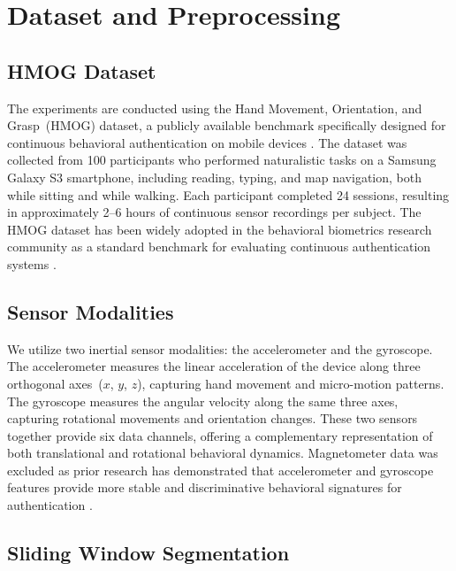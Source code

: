 \documentclass[3p,times,procedia]{elsarticle}
\begin{document}

\section{Dataset and Preprocessing}
\label{sec:dataset}

\subsection{HMOG Dataset}

The experiments are conducted using the Hand Movement,
Orientation, and Grasp~(HMOG) dataset, a publicly available
benchmark specifically designed for continuous behavioral
authentication on mobile devices \cite{sitova_hmog_2016}. The dataset
was collected from 100 participants who performed naturalistic
tasks on a Samsung Galaxy S3 smartphone, including reading,
typing, and map navigation, both while sitting and while
walking. Each participant completed 24 sessions, resulting in
approximately 2--6 hours of continuous sensor recordings per
subject. The HMOG dataset has been widely adopted in the
behavioral biometrics research community as a standard benchmark
for evaluating continuous authentication systems \cite{sitova_hmog_2016}.

\subsection{Sensor Modalities}

We utilize two inertial sensor modalities: the accelerometer
and the gyroscope. The accelerometer measures the linear
acceleration of the device along three orthogonal
axes~($x$, $y$, $z$), capturing hand movement and micro-motion
patterns. The gyroscope measures the angular velocity along the
same three axes, capturing rotational movements and orientation
changes. These two sensors together provide six data channels,
offering a complementary representation of both translational
and rotational behavioral dynamics. Magnetometer data was
excluded as prior research has demonstrated that accelerometer
and gyroscope features provide more stable and discriminative
behavioral signatures for authentication \cite{shen_performance_2018}.

\subsection{Sliding Window Segmentation}
\end{document}
